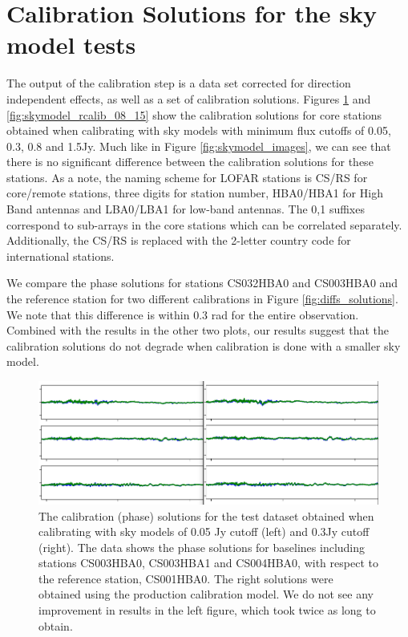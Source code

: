 \appendix

\renewcommand{\theequ}{\Alph{section}.\arabic{equ}}


\section{Calibration Solutions for the sky model tests }\label{ap:calib_solutions}
The output of the calibration step is a data set corrected for direction independent effects, as well as a set of calibration solutions. Figures \ref{fig:skymodel_rcalib_004_03} and \ref{fig:skymodel_rcalib_08_15} show the calibration solutions for core stations obtained when calibrating with sky models with minimum flux cutoffs of 0.05, 0.3, 0.8 and 1.5Jy. Much like in Figure \ref{fig:skymodel_images}, we can see that there is no significant difference between the calibration solutions for these stations. As a note, the naming scheme for LOFAR stations is CS/RS for core/remote stations, three digits for station number, HBA0/HBA1 for High Band antennas and LBA0/LBA1 for low-band antennas. The 0,1 suffixes correspond to sub-arrays in the core stations which can be correlated separately. Additionally, the CS/RS is replaced with the 2-letter country code for international stations\citep{staiton_data_cookbook}.

We compare the phase solutions for stations CS032HBA0 and CS003HBA0 and the reference station for two different calibrations in Figure \ref{fig:diffs_solutions}. We note that this difference is within 0.3 rad for the entire observation. Combined with the results in the other two plots, our results suggest that the calibration solutions do not degrade when calibration is done with a smaller sky model.

\begin{figure}
    \includegraphics[width=0.95\linewidth]{figures/005_and_03_solutsions_CS003HBA0_CS003HBA1_CS004HBA0.png}
      \caption{The calibration (phase) solutions for the test dataset obtained when calibrating with sky models of 0.05 Jy cutoff (left) and 0.3Jy cutoff (right). The data shows the phase solutions for baselines including stations CS003HBA0, CS003HBA1 and CS004HBA0, with respect to the reference station, CS001HBA0. The right solutions were obtained using the production calibration model. We do not see any improvement in results in the left figure, which took twice as long to obtain.}
	\label{fig:skymodel_rcalib_004_03}
\end{figure}

